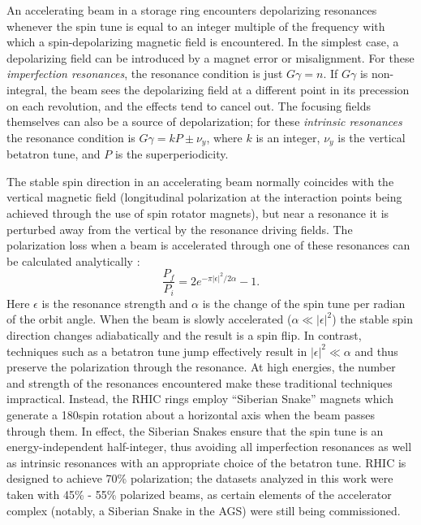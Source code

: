 An accelerating beam in a storage ring encounters depolarizing resonances whenever the spin tune is equal to an integer multiple of the frequency with which a spin-depolarizing magnetic field is encountered.  In the simplest case, a depolarizing field can be introduced by a magnet error or misalignment.  For these \textit{imperfection resonances}, the resonance condition is just $G\gamma = n$.  If $G\gamma$ is non-integral, the beam sees the depolarizing field at a different point in its precession on each revolution, and the effects tend to cancel out.  The focusing fields themselves can also be a source of depolarization; for these \textit{intrinsic resonances} the resonance condition is $G\gamma = kP \pm \nu_y$, where $k$ is an integer, $\nu_y$ is the vertical betatron tune, and $P$ is the superperiodicity.

The stable spin direction in an accelerating beam normally coincides with the vertical magnetic field (longitudinal polarization at the interaction points being achieved through the use of spin rotator magnets), but near a resonance it is perturbed away from the vertical by the resonance driving fields.  The polarization loss when a beam is accelerated through one of these resonances can be calculated analytically \cite{Froissart:1960zz}:
%
\begin{equation}
  \frac{P_f}{P_i} = 2 e^{-\pi |\epsilon|^2 / 2\alpha} -1.
\end{equation}
%
Here $\epsilon$ is the resonance strength and $\alpha$ is the change of the spin tune per radian of the orbit angle.  When the beam is slowly accelerated ($\alpha \ll |\epsilon|^2$) the stable spin direction changes adiabatically and the result is a spin flip.  In contrast, techniques such as a betatron tune jump effectively result in $|\epsilon|^2 \ll \alpha$ and thus preserve the polarization through the resonance.  At high energies, the number and strength of the resonances encountered make these traditional techniques impractical.  Instead, the RHIC rings employ ``Siberian Snake'' magnets \cite{Derbenev:1978hv} which generate a 180\degree spin rotation about a horizontal axis when the beam passes through them.  In effect, the Siberian Snakes ensure that the spin tune is an energy-independent half-integer, thus avoiding all imperfection resonances as well as intrinsic resonances with an appropriate choice of the betatron tune.  RHIC is designed to achieve 70\% polarization; the datasets analyzed in this work were taken with 45\% - 55\% polarized beams, as certain elements of the accelerator complex (notably, a Siberian Snake in the AGS) were still being commissioned.

